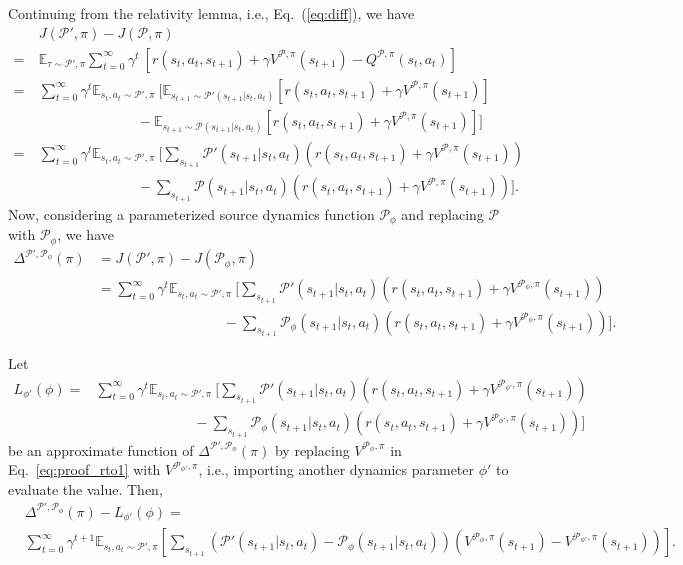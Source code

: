 \documentclass[letterpaper]{article} %
\def\E{{\mathbb{E}}}
\def\P{{\mathcal{P}}}
\begin{document}
Continuing from the relativity lemma, i.e., Eq.~(\ref{eq:diff}), we have
{\small
\begin{align*}
&J(\P',\pi)-J(\P,\pi)
\\
=\ &\E_{\tau\sim\P',\pi}\sum_{t=0}^{\infty}\gamma^t\ 
\left[
r(s_t,a_t,s_{t+1})+\gamma V^{\P,\pi}(s_{t+1})-Q^{\P,\pi}(s_t,a_t)
\right]
\\
=\ &\sum_{t=0}^{\infty}\gamma^t\E_{s_t,a_t\sim \P',\pi}\ 
\big[\E_{s_{t+1}\sim\P'(s_{t+1}|s_t,a_t)}
\left[
r(s_t,a_t,s_{t+1})+\gamma V^{\P,\pi}(s_{t+1})
\right]
\\
\ &\qquad\qquad\qquad\quad
-\E_{s_{t+1}\sim\P(s_{t+1}|s_t,a_t)}
\left[
r(s_t,a_t,s_{t+1})+\gamma V^{\P,\pi}(s_{t+1})
\right]
\big]
\\
=\ &\sum_{t=0}^{\infty}\gamma^t\E_{s_t,a_t\sim \P',\pi}\ 
\Bigg[
\sum_{s_{t+1}}\P'(s_{t+1}|s_t,a_t)\left(
r(s_t,a_t,s_{t+1})+\gamma V^{\P,\pi}(s_{t+1})\right)
\\
\ &\qquad\qquad\qquad\quad
-\sum_{s_{t+1}}\P(s_{t+1}|s_t,a_t)
\left(
r(s_t,a_t,s_{t+1})+\gamma V^{\P,\pi}(s_{t+1})
\right)
\Bigg].
\end{align*}
}\noindent
Now, considering a parameterized source dynamics function $\P_{\phi}$ and replacing $\P$ with $\P_{\phi}$, we have
{\small
\begin{align}
\Delta^{\P',\P_{\phi}}(\pi)
&=J(\P',\pi)-J(\P_{\phi},\pi)
\nonumber
\\
&=\sum_{t=0}^{\infty}\gamma^t\E_{s_t,a_t\sim \P',\pi}\ 
\Bigg[
\sum_{s_{t+1}}\P'(s_{t+1}|s_t,a_t)\left(
r(s_t,a_t,s_{t+1})+\gamma V^{\P_{\phi},\pi}(s_{t+1})\right)
\nonumber
\\
&\qquad\qquad\qquad\qquad\quad
-\sum_{s_{t+1}}\P_{\phi}(s_{t+1}|s_t,a_t)
\left(
r(s_t,a_t,s_{t+1})+\gamma V^{\P_{\phi},\pi}(s_{t+1})
\right)
\Bigg].
\label{eq:proof_rto1}
\end{align}
}\noindent

Let
{\small
\begin{align*}
L_{\phi'}(\phi)=
&\sum_{t=0}^{\infty}\gamma^t\E_{s_t,a_t\sim \P',\pi}\ 
\Bigg[\sum_{s_{t+1}}\P'(s_{t+1}|s_t, a_t)\left(
r(s_t,a_t,s_{t+1})+\gamma V^{\P_{\phi'},\pi}(s_{t+1})\right)
\\
&\qquad\qquad\qquad\quad
-\sum_{s_{t+1}}\P_{\phi}(s_{t+1}|s_t,a_t)
\left(
r(s_t,a_t,s_{t+1})+\gamma V^{\P_{\phi'},\pi}(s_{t+1})
\right)
\Bigg]
\end{align*}
be an approximate function of $\Delta^{\P',\P_{\phi}}(\pi)$ by replacing $V^{\P_{\phi},\pi}$ in Eq.~\eqref{eq:proof_rto1} with $V^{\P_{\phi'},\pi}$, i.e., importing another dynamics parameter $\phi'$ to evaluate the value. Then,
\begin{align*}
&\Delta^{\P',\P_{\phi}}(\pi)-L_{\phi'}(\phi)=
\\
&\sum_{t=0}^{\infty}\gamma^{t+1}\E_{s_t,a_t\sim \P',\pi}\left[
\sum_{s_{t+1}}
\left(
\P'(s_{t+1}|s_t,a_t)-\P_{\phi}(s_{t+1}|s_t,a_t)
\right)
\left(
V^{\P_{\phi},\pi}(s_{t+1})-V^{\P_{\phi'},\pi}(s_{t+1})
\right)
\right].
\end{align*}
}\noindent
\end{document}
